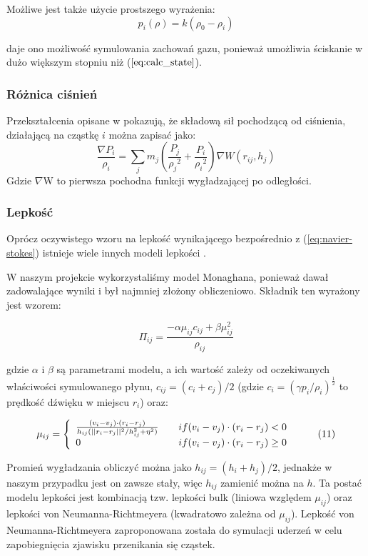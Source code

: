 \documentclass[polish, 12pt]{aghthesis}
\begin{document}
			Możliwe jest także użycie prostszego wyrażenia:	
			\[p_i(\rho) = k(\rho_0 - \rho_i) \tag{9}\]
			
			daje ono możliwość symulowania zachowań gazu, ponieważ umożliwia ściskanie w dużo większym stopniu niż ($\ref{eq:calc_state}$).
			
			\subsubsection{Różnica ciśnień}
			Przekształcenia opisane w \cite{Boryczko} pokazują, że składową sił pochodzącą od ciśnienia, działającą na cząstkę $i$ można zapisać jako: \[\frac{\nabla P_i}{\rho_i} = \sum_j m_j(\frac{P_j}{{\rho_j}^2} + \frac{P_i}{{\rho_i}^2})\nabla W(r_{ij}, h_j) \label{eq:calc_pressure} \tag{9}\] Gdzie ${\nabla}$W to pierwsza pochodna funkcji wygładzającej po odległości.
			
			\subsubsection{Lepkość}
			Oprócz oczywistego wzoru na lepkość wynikającego bezpośrednio z (\ref{eq:navier-stokes}) istnieje wiele innych modeli lepkości \cite{Boryczko}.
						
			W naszym projekcie wykorzystaliśmy model Monaghana, ponieważ dawał zadowalające wyniki i był najmniej złożony obliczeniowo. Składnik ten wyrażony jest wzorem:
			
			\[{\Pi}_{ij} = \frac{-\alpha \mu_{ij} c_{ij} + \beta\mu_{ij}^2}{\rho_{ij}} \label{eq:viscosity_term} \tag{10}\]
	
			gdzie $\alpha$ i $\beta$ są parametrami modelu, a ich wartość zależy od oczekiwanych właściwości symulowanego płynu, $c_{ij} = (c_i + c_j) / 2$ (gdzie $c_i = (\gamma p_i / \rho_i)^\frac{1}{2}$ to prędkość dźwięku w miejscu $r_i$) oraz:
			
			\[{\mu}_{ij} = \left\{
				\begin{array}{l l}
					\frac{(v_i - v_j)\cdot(r_i - r_j)}{h_{ij}(||r_i - r_j||^2 / h_{ij}^2 + \eta^2)} & \quad if{(v_i - v_j)\cdot(r_i - r_j) < 0}  \\ 0 & \quad if{(v_i - v_j)\cdot(r_i - r_j) \geq 0} 
				\end{array} \right.\ \label{eq:mu_factor} \tag{11}\]
				
			Promień wygładzania obliczyć można jako $h_{ij} = (h_i + h_j)/2$, jednakże w naszym przypadku jest on zawsze stały, więc $h_{ij}$ zamienić można na $h$. Ta postać modelu lepkości jest kombinacją tzw. lepkości bulk (liniowa względem $\mu_{ij}$) oraz lepkości von Neumanna-Richtmeyera (kwadratowo zależna od $\mu_{ij}$). Lepkość von Neumanna-Richtmeyera zaproponowana została do symulacji uderzeń w celu zapobiegnięcia zjawisku przenikania się cząstek. 
			
\end{document}
